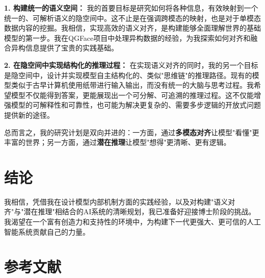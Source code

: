 \documentclass[11pt, letterpaper]{article}
\begin{document}
\textbf{1. 构建统一的语义空间：} 我的首要目标是研究如何将各种信息，有效映射到一个统一的、可解析语义的隐空间中。这不止是在强调跨模态的映射，也是对于单模态数据内容的挖掘。我相信，实现高效的语义对齐，是构建能够全面理解世界的基础模型的第一步。我在QGFace项目中处理异构数据的经验，为我探索如何对齐和融合异构信息提供了宝贵的实践基础。

\textbf{2. 在隐空间中实现结构化的推理过程：} 在实现语义对齐的同时，我的另一个目标是隐空间中，设计并实现模型自主结构化的、类似"思维链"的推理路径。现有的模型类似于古早计算机使用纸带进行输入输出，而没有统一的大脑与思考过程。我希望模型不仅能得到答案，更能展现出一个可分解、可追溯的推理过程。这不仅能增强模型的可解释性和可靠性，也可能为解决更复杂的、需要多步逻辑的开放式问题提供新的途径。

总而言之，我的研究计划是双向并进的：一方面，通过\textbf{多模态对齐}让模型"看懂"更丰富的世界；另一方面，通过\textbf{潜在推理}让模型"想得"更清晰、更有逻辑。

\section{结论}

我相信，凭借我在设计模型内部机制方面的实践经验，以及对构建"语义对齐"与"潜在推理"相结合的AI系统的清晰规划，我已准备好迎接博士阶段的挑战。我渴望在一个富有创造力和支持性的环境中，为构建下一代更强大、更可信的人工智能系统贡献自己的力量。

\section*{参考文献}


\end{document}
